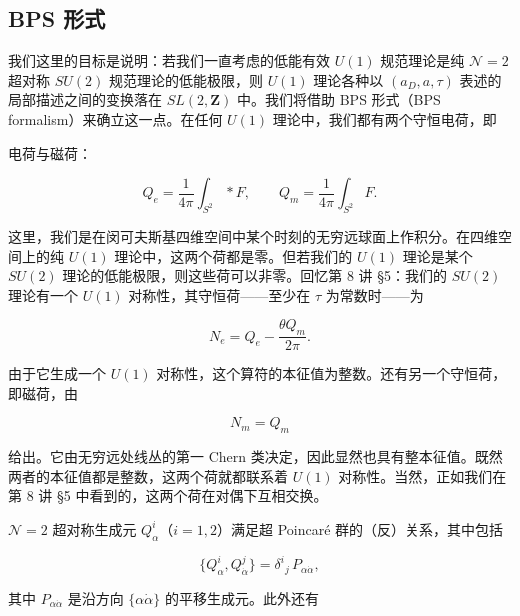\subsection{BPS 形式}

我们这里的目标是说明：若我们一直考虑的低能有效 $U(1)$ 规范理论是纯 $\mathcal{N}=2$ 超对称 $SU(2)$ 规范理论的低能极限，则 $U(1)$ 理论各种以 $(a_D,a,\tau)$ 表述的局部描述之间的变换落在 $SL(2,\mathbf{Z})$ 中。我们将借助 BPS 形式（BPS formalism）来确立这一点。在任何 $U(1)$ 理论中，我们都有两个守恒电荷，即


电荷与磁荷：

\[
  Q_e=\frac{1}{4\pi}\int_{S^2}*F,\qquad
  Q_m=\frac{1}{4\pi}\int_{S^2}F .
\]

这里，我们是在闵可夫斯基四维空间中某个时刻的无穷远球面上作积分。在四维空间上的纯 $U(1)$ 理论中，这两个荷都是零。但若我们的 $U(1)$ 理论是某个 $SU(2)$ 理论的低能极限，则这些荷可以非零。回忆第 8 讲 §5：我们的 $SU(2)$ 理论有一个 $U(1)$ 对称性，其守恒荷——至少在 $\tau$ 为常数时——为

\[
  N_e=Q_e-\frac{\theta Q_m}{2\pi}.
\]

由于它生成一个 $U(1)$ 对称性，这个算符的本征值为整数。还有另一个守恒荷，即磁荷，由

\[
  N_m=Q_m
\]

给出。它由无穷远处线丛的第一 Chern 类决定，因此显然也具有整本征值。既然两者的本征值都是整数，这两个荷就都联系着 $U(1)$ 对称性。当然，正如我们在第 8 讲 §5 中看到的，这两个荷在对偶下互相交换。


$\mathcal{N}=2$ 超对称生成元 $Q^i_\alpha$（$i=1,2$）满足超 Poincaré 群的（反）关系，其中包括

\[
  \{Q^i_\alpha,Q^j_{\dot\alpha}\}=\delta^i{}_j\,P_{\alpha\dot\alpha},
\]

其中 $P_{\alpha\dot\alpha}$ 是沿方向 $\{\alpha\dot\alpha\}$ 的平移生成元。此外还有

